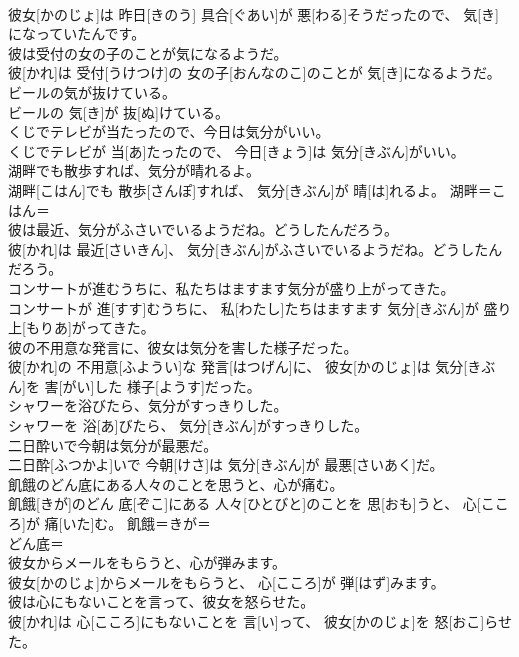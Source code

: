 \documentclass[8pt]{extreport}
\begin{document}
\begin{CJK}{UTF8}{min}
\\	彼女[かのじょ]は 昨日[きのう] 具合[ぐあい]が 悪[わる]そうだったので、 気[き]になっていたんです。	
\\	彼は受付の女の子のことが気になるようだ。	
\\	彼[かれ]は 受付[うけつけ]の 女の子[おんなのこ]のことが 気[き]になるようだ。	
\\	ビールの気が抜けている。	
\\	ビールの 気[き]が 抜[ぬ]けている。	
\\	くじでテレビが当たったので、今日は気分がいい。	
\\	くじでテレビが 当[あ]たったので、 今日[きょう]は 気分[きぶん]がいい。	
\\	湖畔でも散歩すれば、気分が晴れるよ。	
\\	湖畔[こはん]でも 散歩[さんぽ]すれば、 気分[きぶん]が 晴[は]れるよ。	湖畔＝こはん＝ 
\\	彼は最近、気分がふさいでいるようだね。どうしたんだろう。	
\\	彼[かれ]は 最近[さいきん]、 気分[きぶん]がふさいでいるようだね。どうしたんだろう。	
\\	コンサートが進むうちに、私たちはますます気分が盛り上がってきた。	
\\	コンサートが 進[すす]むうちに、 私[わたし]たちはますます 気分[きぶん]が 盛り上[もりあ]がってきた。	
\\	彼の不用意な発言に、彼女は気分を害した様子だった。	
\\	彼[かれ]の 不用意[ふようい]な 発言[はつげん]に、 彼女[かのじょ]は 気分[きぶん]を 害[がい]した 様子[ようす]だった。	
\\	シャワーを浴びたら、気分がすっきりした。	
\\	シャワーを 浴[あ]びたら、 気分[きぶん]がすっきりした。	
\\	二日酔いで今朝は気分が最悪だ。	
\\	二日酔[ふつかよ]いで 今朝[けさ]は 気分[きぶん]が 最悪[さいあく]だ。	
\\	飢餓のどん底にある人々のことを思うと、心が痛む。	
\\	飢餓[きが]のどん 底[ぞこ]にある 人々[ひとびと]のことを 思[おも]うと、 心[こころ]が 痛[いた]む。	飢餓＝きが＝ 
\\	どん底＝ 
\\	彼女からメールをもらうと、心が弾みます。	
\\	彼女[かのじょ]からメールをもらうと、 心[こころ]が 弾[はず]みます。	
\\	彼は心にもないことを言って、彼女を怒らせた。	
\\	彼[かれ]は 心[こころ]にもないことを 言[い]って、 彼女[かのじょ]を 怒[おこ]らせた。	

\end{CJK}
\end{document}
